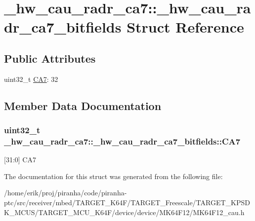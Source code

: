 \hypertarget{struct__hw__cau__radr__ca7_1_1__hw__cau__radr__ca7__bitfields}{}\section{\+\_\+hw\+\_\+cau\+\_\+radr\+\_\+ca7\+:\+:\+\_\+hw\+\_\+cau\+\_\+radr\+\_\+ca7\+\_\+bitfields Struct Reference}
\label{struct__hw__cau__radr__ca7_1_1__hw__cau__radr__ca7__bitfields}
\subsection*{Public Attributes}
\begin{DoxyCompactItemize}
\item 
uint32\+\_\+t \hyperlink{struct__hw__cau__radr__ca7_1_1__hw__cau__radr__ca7__bitfields_ab9f3c4b824d923ff643f7de32394064c}{C\+A7}\+: 32
\end{DoxyCompactItemize}


\subsection{Member Data Documentation}
\subsubsection[{\texorpdfstring{C\+A7}{CA7}}]{\setlength{\rightskip}{0pt plus 5cm}uint32\+\_\+t \+\_\+hw\+\_\+cau\+\_\+radr\+\_\+ca7\+::\+\_\+hw\+\_\+cau\+\_\+radr\+\_\+ca7\+\_\+bitfields\+::\+C\+A7}\hypertarget{struct__hw__cau__radr__ca7_1_1__hw__cau__radr__ca7__bitfields_ab9f3c4b824d923ff643f7de32394064c}{}\label{struct__hw__cau__radr__ca7_1_1__hw__cau__radr__ca7__bitfields_ab9f3c4b824d923ff643f7de32394064c}
\mbox{[}31\+:0\mbox{]} C\+A7 

The documentation for this struct was generated from the following file\+:\begin{DoxyCompactItemize}
\item 
/home/erik/proj/piranha/code/piranha-\/ptc/src/receiver/mbed/\+T\+A\+R\+G\+E\+T\+\_\+\+K64\+F/\+T\+A\+R\+G\+E\+T\+\_\+\+Freescale/\+T\+A\+R\+G\+E\+T\+\_\+\+K\+P\+S\+D\+K\+\_\+\+M\+C\+U\+S/\+T\+A\+R\+G\+E\+T\+\_\+\+M\+C\+U\+\_\+\+K64\+F/device/device/\+M\+K64\+F12/M\+K64\+F12\+\_\+cau.\+h\end{DoxyCompactItemize}
